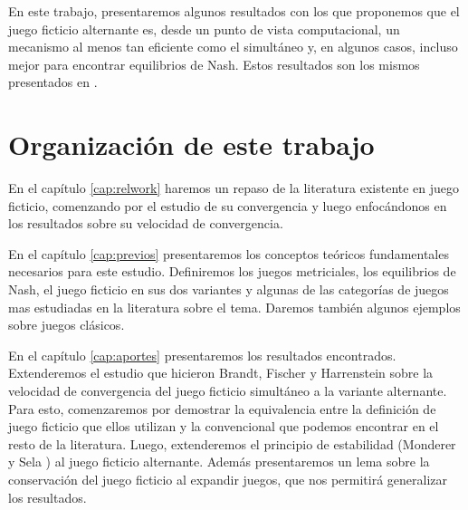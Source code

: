 En este trabajo, presentaremos algunos resultados con los que proponemos que el juego ficticio alternante es, desde un punto de vista computacional, un mecanismo al menos tan eficiente como el simultáneo y, en algunos casos, incluso mejor para encontrar equilibrios de Nash. Estos resultados son los mismos presentados en \cite{arbiser:badaloni}.



\section{Organización de este trabajo}

 En el capítulo \ref{cap:relwork} haremos un repaso de la literatura existente en juego ficticio, comenzando por el estudio de su convergencia y luego enfocándonos en los resultados sobre su velocidad de convergencia. 
 
 En el capítulo \ref{cap:previos} presentaremos los conceptos teóricos fundamentales necesarios para este estudio. Definiremos los juegos metriciales, los equilibrios de Nash, el juego ficticio en sus dos variantes y algunas de las categorías de juegos mas estudiadas en la literatura sobre el tema. Daremos también algunos ejemplos sobre juegos clásicos.

 En el capítulo \ref{cap:aportes} presentaremos los resultados encontrados. Extenderemos el estudio que hicieron Brandt, Fischer y Harrenstein \cite{brandt:rate:convergence} sobre la velocidad de convergencia del juego ficticio simultáneo a la variante alternante. Para esto, comenzaremos por demostrar la equivalencia entre la definición de juego ficticio que ellos utilizan y la convencional que podemos encontrar en el resto de la literatura. Luego, extenderemos el principio de estabilidad (Monderer y Sela \cite{no:cycling}) al juego ficticio alternante. Además presentaremos un lema sobre la conservación del juego ficticio al expandir juegos, que nos permitirá generalizar los resultados.